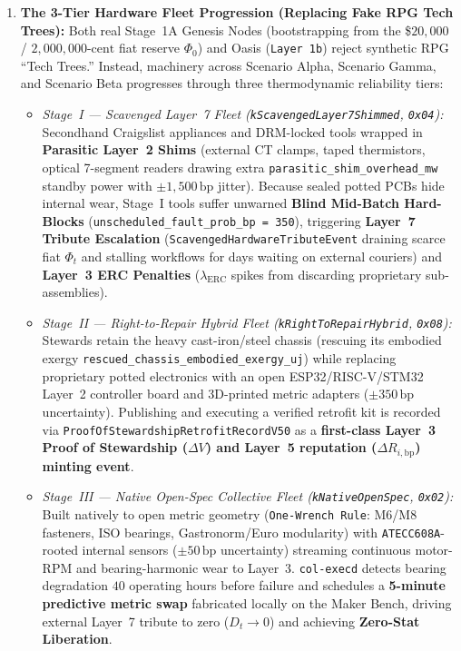 \begin{enumerate}
    \item \textbf{The 3-Tier Hardware Fleet Progression (Replacing Fake RPG Tech Trees):}
    Both real Stage~1A Genesis Nodes (bootstrapping from the \$$20{,}000$ / $2{,}000{,}000\text{-cent}$
    fiat reserve $\Phi_0$) and Oasis (\texttt{Layer 1b}) reject synthetic RPG ``Tech Trees.'' Instead,
    machinery across Scenario Alpha, Scenario Gamma, and Scenario Beta progresses through three
    thermodynamic reliability tiers:
    \begin{itemize}
        \item \emph{Stage~I --- Scavenged Layer~7 Fleet (\texttt{kScavengedLayer7Shimmed}, \texttt{0x04}):}
        Secondhand Craigslist appliances and DRM-locked tools wrapped in \textbf{Parasitic Layer~2
        Shims} (external CT clamps, taped thermistors, optical 7-segment readers drawing extra
        \texttt{parasitic\_shim\_overhead\_mw} standby power with $\pm 1{,}500\,\mathrm{bp}$ jitter).
        Because sealed potted PCBs hide internal wear, Stage~I tools suffer unwarned \textbf{Blind
        Mid-Batch Hard-Blocks} (\texttt{unscheduled\_fault\_prob\_bp = 350}), triggering
        \textbf{Layer~7 Tribute Escalation} (\texttt{ScavengedHardwareTributeEvent} draining scarce fiat
        $\Phi_t$ and stalling workflows for days waiting on external couriers) and \textbf{Layer~3 ERC
        Penalties} ($\lambda_{\mathrm{ERC}}$ spikes from discarding proprietary sub-assemblies).
        \item \emph{Stage~II --- Right-to-Repair Hybrid Fleet (\texttt{kRightToRepairHybrid}, \texttt{0x08}):}
        Stewards retain the heavy cast-iron/steel chassis (rescuing its embodied exergy
        \texttt{rescued\_chassis\_embodied\_exergy\_uj}) while replacing proprietary potted electronics
        with an open ESP32/RISC-V/STM32 Layer~2 controller board and 3D-printed metric adapters
        ($\pm 350\,\mathrm{bp}$ uncertainty). Publishing and executing a verified retrofit kit is
        recorded via \texttt{ProofOfStewardshipRetrofitRecordV50} as a \textbf{first-class Layer~3
        Proof of Stewardship ($\Delta V$) and Layer~5 reputation ($\Delta R_{i,\mathrm{bp}}$) minting
        event}.
        \item \emph{Stage~III --- Native Open-Spec Collective Fleet (\texttt{kNativeOpenSpec}, \texttt{0x02}):}
        Built natively to open metric geometry (\texttt{One-Wrench Rule}: M6/M8 fasteners, ISO
        bearings, Gastronorm/Euro modularity) with \texttt{ATECC608A}-rooted internal sensors
        ($\pm 50\,\mathrm{bp}$ uncertainty) streaming continuous motor-RPM and bearing-harmonic wear to
        Layer~3. \texttt{col-execd} detects bearing degradation $40$ operating hours before failure and
        schedules a \textbf{5-minute predictive metric swap} fabricated locally on the Maker Bench,
        driving external Layer~7 tribute to zero ($D_t \to 0$) and achieving \textbf{Zero-Stat
        Liberation}.
    \end{itemize}
\end{enumerate}

